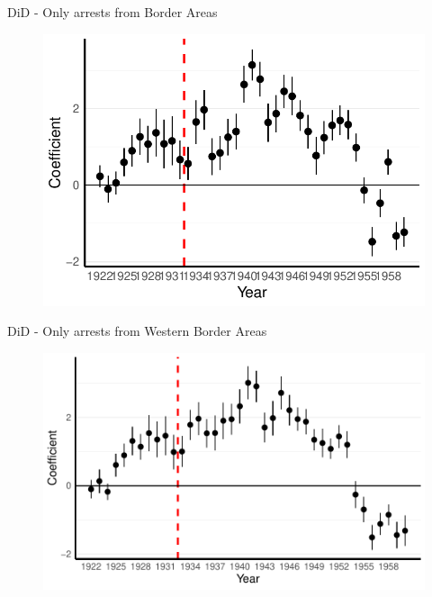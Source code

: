 \documentclass[11pt]{beamer}
\begin{document}
\begin{frame}[label=did_border_area]{DiD - Only arrests from Border Areas}
 \begin{figure}[h]
\centering
\includegraphics[width=1\textwidth]{point_range_robust_cr2_border_provinces.pdf}
\end{figure}
\hyperlink{robustness_checks}{}
\end{frame}


\begin{frame}[label=did_border_area_west]{DiD - Only arrests from Western Border Areas}
 \begin{figure}[h]
\centering
\includegraphics[width=1\textwidth]{point_range_robust_cr2_border_provinces_western.pdf}
\end{figure}
\hyperlink{add_content}{}
\end{frame}
\end{document}
